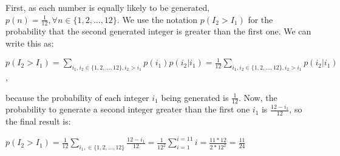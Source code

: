 \documentclass[12pt,a4paper,oneside,draft]{report}
\begin{document}
First, as each number is equally likely to be generated, $p(n) = \frac{1}{12}, \forall n \in \{1, 2, ..., 12\} $. We use the notation $p(I_2 > I_1)$ for the probability that the second generated integer is greater than the first one. We can write this as: \\
\begin{center}
$p(I_2 > I_1) = \sum_{i_1, i_2 \in \{1, 2, ..., 12\}, i_2 > i_1} p(i_1) p(i_2 \vert i_1) = \frac{1}{12} \sum_{i_1, i_2 \in \{1, 2, ..., 12\}, i_2 > i_1} p(i_2 \vert i_1)$,    
\end{center} because the probability of each integer $i_1$ being generated is $\frac{1}{12}$.
Now, the probability to generate a second integer greater than the first one $i_1$ is $\frac{12 - i_1}{12}$, so the final result is:\\
\begin{center}
$p(I_2 > I_1) = \frac{1}{12} \sum_{i_1, \in \{1, 2, ..., 12\}} \frac{12 - i_1}{12} =  \frac{1}{12^2} \sum_{i=1}^{i=11} i = 
\frac{11 * 12}{2 * 12^2} = \frac{11}{24}$
\end{center}
\end{document}
